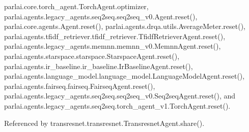parlai.\+core.\+torch\+\_\+agent.\+Torch\+Agent.\+optimizer, parlai.\+agents.\+legacy\+\_\+agents.\+seq2seq.\+seq2seq\+\_\+v0.\+Agent.\+reset(), parlai.\+core.\+agents.\+Agent.\+reset(), parlai.\+agents.\+drqa.\+utils.\+Average\+Meter.\+reset(), parlai.\+agents.\+tfidf\+\_\+retriever.\+tfidf\+\_\+retriever.\+Tfidf\+Retriever\+Agent.\+reset(), parlai.\+agents.\+legacy\+\_\+agents.\+memnn.\+memnn\+\_\+v0.\+Memnn\+Agent.\+reset(), parlai.\+agents.\+starspace.\+starspace.\+Starspace\+Agent.\+reset(), parlai.\+agents.\+ir\+\_\+baseline.\+ir\+\_\+baseline.\+Ir\+Baseline\+Agent.\+reset(), parlai.\+agents.\+language\+\_\+model.\+language\+\_\+model.\+Language\+Model\+Agent.\+reset(), parlai.\+agents.\+fairseq.\+fairseq.\+Fairseq\+Agent.\+reset(), parlai.\+agents.\+legacy\+\_\+agents.\+seq2seq.\+seq2seq\+\_\+v0.\+Seq2seq\+Agent.\+reset(), and parlai.\+agents.\+legacy\+\_\+agents.\+seq2seq.\+torch\+\_\+agent\+\_\+v1.\+Torch\+Agent.\+reset().



Referenced by transresnet.\+transresnet.\+Transresnet\+Agent.\+share().

